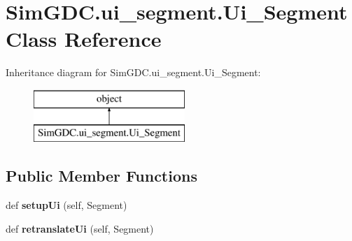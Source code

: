 \hypertarget{class_sim_g_d_c_1_1ui__segment_1_1_ui___segment}{}\section{Sim\+G\+D\+C.\+ui\+\_\+segment.\+Ui\+\_\+\+Segment Class Reference}
\label{class_sim_g_d_c_1_1ui__segment_1_1_ui___segment}
Inheritance diagram for Sim\+G\+D\+C.\+ui\+\_\+segment.\+Ui\+\_\+\+Segment\+:\begin{figure}[H]
\begin{center}
\leavevmode
\includegraphics[height=2.000000cm]{class_sim_g_d_c_1_1ui__segment_1_1_ui___segment}
\end{center}
\end{figure}
\subsection*{Public Member Functions}
\begin{DoxyCompactItemize}
\item 
\hypertarget{class_sim_g_d_c_1_1ui__segment_1_1_ui___segment_a10cefb620f1d10aff0a68cc57fffb7b4}{}def {\bfseries setup\+Ui} (self, Segment)\label{class_sim_g_d_c_1_1ui__segment_1_1_ui___segment_a10cefb620f1d10aff0a68cc57fffb7b4}

\item 
\hypertarget{class_sim_g_d_c_1_1ui__segment_1_1_ui___segment_aec890a7a37e5ffaf4dd92931afa2e871}{}def {\bfseries retranslate\+Ui} (self, Segment)\label{class_sim_g_d_c_1_1ui__segment_1_1_ui___segment_aec890a7a37e5ffaf4dd92931afa2e871}

\end{DoxyCompactItemize}
